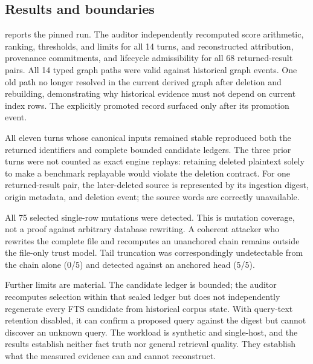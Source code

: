 \subsection{Results and boundaries}
\label{sec:forensics-results}

 reports the pinned run. The auditor independently
recomputed score arithmetic, ranking, thresholds, and limits for all 14
turns, and reconstructed attribution, provenance commitments, and lifecycle
admissibility for all 68 returned-result pairs. All 14 typed graph paths were
valid against historical graph events. One old path no longer resolved in the
current derived graph after deletion and rebuilding, demonstrating why
historical evidence must not depend on current index rows. The explicitly
promoted record surfaced only after its promotion event.

All eleven turns whose canonical inputs remained stable reproduced both the
returned identifiers and complete bounded candidate ledgers. The three prior
turns were not counted as exact engine replays: retaining deleted plaintext
solely to make a benchmark replayable would violate the deletion contract.
For one returned-result pair, the later-deleted source is represented by its
ingestion digest, origin metadata, and deletion event; the source words are
correctly unavailable.

All 75 selected single-row mutations were detected. This is mutation coverage,
not a proof against arbitrary database rewriting. A coherent attacker who
rewrites the complete file and recomputes an unanchored chain remains outside
the file-only trust model. Tail truncation was correspondingly undetectable
from the chain alone (0/5) and detected against an anchored head (5/5).

Further limits are material. The candidate ledger is bounded; the auditor
recomputes selection within that sealed ledger but does not independently
regenerate every FTS candidate from historical corpus state. With query-text
retention disabled, it can confirm a proposed query against the digest but
cannot discover an unknown query. The workload is synthetic and single-host,
and the results establish neither fact truth nor general retrieval quality.
They establish what the measured evidence can and cannot reconstruct.

